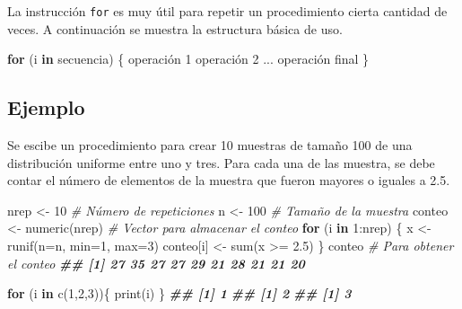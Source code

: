 \documentclass[
]{book}
\newenvironment{Shaded}{\begin{snugshade}}{\end{snugshade}}
\newcommand{\AttributeTok}[1]{\textcolor[rgb]{0.77,0.63,0.00}{#1}}
\newcommand{\CommentTok}[1]{\textcolor[rgb]{0.56,0.35,0.01}{\textit{#1}}}
\newcommand{\ControlFlowTok}[1]{\textcolor[rgb]{0.13,0.29,0.53}{\textbf{#1}}}
\newcommand{\DecValTok}[1]{\textcolor[rgb]{0.00,0.00,0.81}{#1}}
\newcommand{\DocumentationTok}[1]{\textcolor[rgb]{0.56,0.35,0.01}{\textbf{\textit{#1}}}}
\newcommand{\FloatTok}[1]{\textcolor[rgb]{0.00,0.00,0.81}{#1}}
\newcommand{\FunctionTok}[1]{\textcolor[rgb]{0.00,0.00,0.00}{#1}}
\newcommand{\NormalTok}[1]{#1}
\newcommand{\OtherTok}[1]{\textcolor[rgb]{0.56,0.35,0.01}{#1}}
\newcommand{\SpecialCharTok}[1]{\textcolor[rgb]{0.00,0.00,0.00}{#1}}
\begin{document}
La instrucción \texttt{for} es muy útil para repetir un procedimiento cierta cantidad de veces. A continuación se muestra la estructura básica de uso.

\begin{Shaded}
\begin{Highlighting}[]
\ControlFlowTok{for}\NormalTok{ (i }\ControlFlowTok{in}\NormalTok{ secuencia) \{}
\NormalTok{  operación }\DecValTok{1}
\NormalTok{  operación }\DecValTok{2}
\NormalTok{  ...}
\NormalTok{  operación final}
\NormalTok{\}}
\end{Highlighting}
\end{Shaded}

\hypertarget{ejemplo-17}{%
\subsection*{Ejemplo}\label{ejemplo-17}}

Se escibe un procedimiento para crear 10 muestras de tamaño 100 de una distribución uniforme entre uno y tres. Para cada una de las muestra, se debe contar el número de elementos de la muestra que fueron mayores o iguales a 2.5.

\begin{Shaded}
\begin{Highlighting}[]
\NormalTok{nrep }\OtherTok{\textless{}{-}} \DecValTok{10}  \CommentTok{\# Número de repeticiones}
\NormalTok{n }\OtherTok{\textless{}{-}} \DecValTok{100}    \CommentTok{\# Tamaño de la muestra}
\NormalTok{conteo }\OtherTok{\textless{}{-}} \FunctionTok{numeric}\NormalTok{(nrep)  }\CommentTok{\# Vector para almacenar el conteo}
\ControlFlowTok{for}\NormalTok{ (i }\ControlFlowTok{in} \DecValTok{1}\SpecialCharTok{:}\NormalTok{nrep) \{}
\NormalTok{  x }\OtherTok{\textless{}{-}} \FunctionTok{runif}\NormalTok{(}\AttributeTok{n=}\NormalTok{n, }\AttributeTok{min=}\DecValTok{1}\NormalTok{, }\AttributeTok{max=}\DecValTok{3}\NormalTok{)}
\NormalTok{  conteo[i] }\OtherTok{\textless{}{-}} \FunctionTok{sum}\NormalTok{(x }\SpecialCharTok{\textgreater{}=} \FloatTok{2.5}\NormalTok{)}
\NormalTok{\}}
\NormalTok{conteo  }\CommentTok{\# Para obtener el conteo}
\DocumentationTok{\#\#  [1] 27 35 27 27 29 21 28 21 21 20}
\end{Highlighting}
\end{Shaded}

\begin{Shaded}
\begin{Highlighting}[]
\ControlFlowTok{for}\NormalTok{ (i }\ControlFlowTok{in} \FunctionTok{c}\NormalTok{(}\DecValTok{1}\NormalTok{,}\DecValTok{2}\NormalTok{,}\DecValTok{3}\NormalTok{))\{}
  \FunctionTok{print}\NormalTok{(i)}
\NormalTok{\}}
\DocumentationTok{\#\# [1] 1}
\DocumentationTok{\#\# [1] 2}
\DocumentationTok{\#\# [1] 3}
\end{Highlighting}
\end{Shaded}
\end{document}
